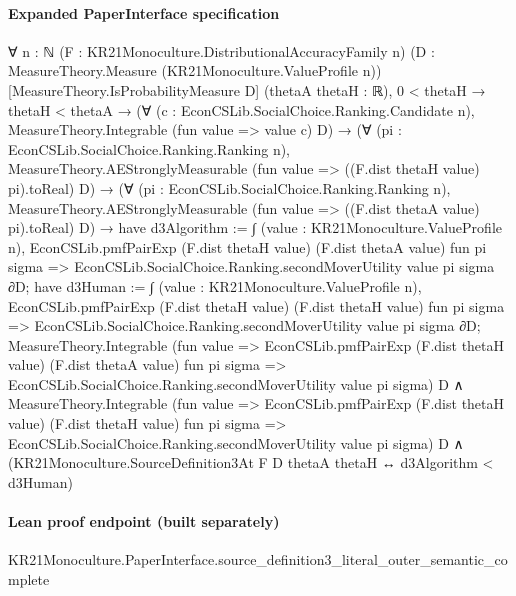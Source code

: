 \documentclass[10pt]{article}
\begin{document}
\paragraph{Expanded PaperInterface specification}
\begin{ReviewVerbatim}
∀ {n : ℕ} (F : KR21Monoculture.DistributionalAccuracyFamily n)
  (D : MeasureTheory.Measure (KR21Monoculture.ValueProfile n)) [MeasureTheory.IsProbabilityMeasure D]
  (thetaA thetaH : ℝ),
  0 < thetaH →
    thetaH < thetaA →
      (∀ (c : EconCSLib.SocialChoice.Ranking.Candidate n), MeasureTheory.Integrable (fun value => value c) D) →
        (∀ (pi : EconCSLib.SocialChoice.Ranking.Ranking n),
            MeasureTheory.AEStronglyMeasurable (fun value => ((F.dist thetaH value) pi).toReal) D) →
          (∀ (pi : EconCSLib.SocialChoice.Ranking.Ranking n),
              MeasureTheory.AEStronglyMeasurable (fun value => ((F.dist thetaA value) pi).toReal) D) →
            have d3Algorithm :=
              ∫ (value : KR21Monoculture.ValueProfile n),
                EconCSLib.pmfPairExp (F.dist thetaH value) (F.dist thetaA value) fun pi sigma =>
                  EconCSLib.SocialChoice.Ranking.secondMoverUtility value pi sigma ∂D;
            have d3Human :=
              ∫ (value : KR21Monoculture.ValueProfile n),
                EconCSLib.pmfPairExp (F.dist thetaH value) (F.dist thetaH value) fun pi sigma =>
                  EconCSLib.SocialChoice.Ranking.secondMoverUtility value pi sigma ∂D;
            MeasureTheory.Integrable
                (fun value =>
                  EconCSLib.pmfPairExp (F.dist thetaH value) (F.dist thetaA value) fun pi sigma =>
                    EconCSLib.SocialChoice.Ranking.secondMoverUtility value pi sigma)
                D ∧
              MeasureTheory.Integrable
                  (fun value =>
                    EconCSLib.pmfPairExp (F.dist thetaH value) (F.dist thetaH value) fun pi sigma =>
                      EconCSLib.SocialChoice.Ranking.secondMoverUtility value pi sigma)
                  D ∧
                (KR21Monoculture.SourceDefinition3At F D thetaA thetaH ↔ d3Algorithm < d3Human)
\end{ReviewVerbatim}

\paragraph{Lean proof endpoint (built separately)}\begin{ReviewVerbatim}
KR21Monoculture.PaperInterface.source_definition3_literal_outer_semantic_complete
\end{ReviewVerbatim}
\end{document}
